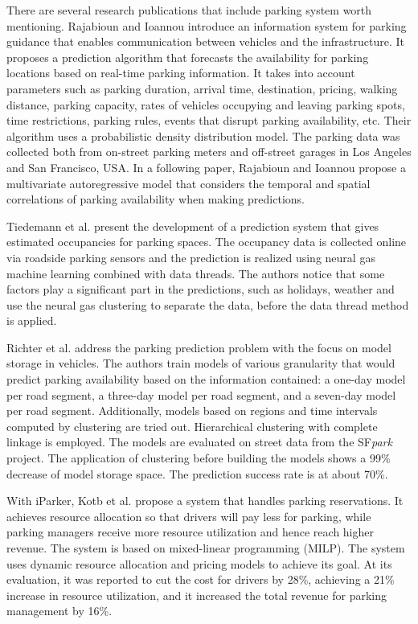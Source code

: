 	There are several research publications that include parking system worth mentioning. Rajabioun and Ioannou\cite{rajabioun2013} introduce an information system for parking guidance that enables communication between vehicles and the infrastructure. It proposes a prediction algorithm that forecasts the availability for parking locations based on real-time parking information. It takes into account parameters such as parking duration, arrival time, destination, pricing, walking distance, parking capacity, rates of vehicles occupying and leaving parking spots, time restrictions, parking rules, events that disrupt parking availability, etc. Their algorithm uses a probabilistic density distribution model. The parking data was collected both from on-street parking meters and off-street garages in Los Angeles and San Francisco, USA. In a following paper, Rajabioun and Ioannou\cite{rajabioun2015} propose a multivariate autoregressive model that considers the temporal and spatial correlations of parking availability when making predictions. 
	
	Tiedemann et al.\cite{tiedemann} present the development of a prediction system that gives estimated occupancies for parking spaces. The occupancy data is collected online via roadside parking sensors and the prediction is realized using neural gas machine learning combined with data threads. The authors notice that some factors play a significant part in the predictions, such as holidays, weather and use the neural gas clustering to separate the data, before the data thread method is applied. 
	
	Richter et al.\cite{richter} address the parking prediction problem with the focus on model storage in vehicles. The authors train models of various granularity that would predict parking availability based on the information contained: a one-day model per road segment, a three-day model per road segment, and a seven-day model per road segment. Additionally, models based on regions and time intervals computed by clustering are tried out. Hierarchical clustering with complete linkage is employed. The models are evaluated on street data from the SF\textit{park} project\cite{sfpark_open_data}. The application of clustering before building the models shows a 99\% decrease of model storage space. The prediction success rate is at about 70\%. 
	
	With iParker, Kotb et al.\cite{kotb} propose a system that handles parking reservations. It achieves resource allocation so that drivers will pay less for parking, while parking managers receive more resource utilization and hence reach higher revenue. The system is based on mixed-linear programming (MILP). The system uses dynamic resource allocation and pricing models to achieve its goal. At its evaluation, it was reported to cut the cost for drivers by 28\%, achieving a 21\% increase in resource utilization, and it increased the total revenue for parking management by 16\%. 
	
